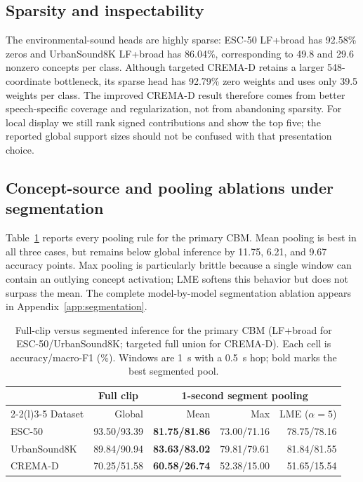 \documentclass[10pt]{article}
\newcommand{\best}[1]{\textbf{#1}}
\begin{document}
\subsection{Sparsity and inspectability}
The environmental-sound heads are highly sparse: ESC-50 LF+broad has 92.58\% zeros and UrbanSound8K LF+broad has 86.04\%, corresponding to 49.8 and 29.6 nonzero concepts per class. Although targeted CREMA-D retains a larger 548-coordinate bottleneck, its sparse head has 92.79\% zero weights and uses only 39.5 weights per class. The improved CREMA-D result therefore comes from better speech-specific coverage and regularization, not from abandoning sparsity. For local display we still rank signed contributions and show the top five; the reported global support sizes should not be confused with that presentation choice.

\subsection{Concept-source and pooling ablations under segmentation}
Table~\ref{tab:segpool} reports every pooling rule for the primary CBM. Mean pooling is best in all three cases, but remains below global inference by 11.75, 6.21, and 9.67 accuracy points. Max pooling is particularly brittle because a single window can contain an outlying concept activation; LME softens this behavior but does not surpass the mean. The complete model-by-model segmentation ablation appears in Appendix~\ref{app:segmentation}.

\begin{table}[t]
\centering
\small
\caption{Full-clip versus segmented inference for the primary CBM (LF+broad for ESC-50/UrbanSound8K; targeted full union for CREMA-D). Each cell is accuracy/macro-F1 (\%). Windows are 1~s with a 0.5~s hop; bold marks the best segmented pool.}
\label{tab:segpool}
\setlength{\tabcolsep}{6.6pt}
\begin{tabular}{l r|rrr}
\toprule
& \multicolumn{1}{c|}{Full clip} & \multicolumn{3}{c}{1-second segment pooling} \\
\cmidrule(lr){2-2}\cmidrule(l){3-5}
Dataset & Global & Mean & Max & LME ($\alpha=5$) \\
\midrule
ESC-50 & 93.50/93.39 & \best{81.75/81.86} & 73.00/71.16 & 78.75/78.16 \\
UrbanSound8K & 89.84/90.94 & \best{83.63/83.02} & 79.81/79.61 & 81.84/81.55 \\
CREMA-D & 70.25/51.58 & \best{60.58/26.74} & 52.38/15.00 & 51.65/15.54 \\
\bottomrule
\end{tabular}
\end{table}
\end{document}
